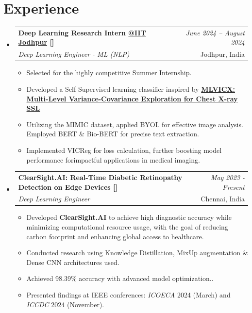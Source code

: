\documentclass[a4paper,11pt]{article}
\makeatletter
\newcommand{\resumeSubheading}[4]{
\vspace{0.5mm}\item
    \begin{tabular*}{0.98\textwidth}[t]{l@{\extracolsep{\fill}}r}
        \textbf{#1} & \textit{\footnotesize{#4}} \\
        \textit{\footnotesize{#3}} &  \footnotesize{#2}\\
    \end{tabular*}
    \vspace{-2.4mm}
}
\newcommand{\resumeSubHeadingListStart}{\begin{itemize}[leftmargin=*,labelsep=1mm]}
\newcommand{\resumeItemListStart}{\begin{itemize}[leftmargin=*,labelsep=1mm,itemsep=0.5mm]}
\newcommand{\resumeSubHeadingListEnd}{\end{itemize}\vspace{2mm}}
\newcommand{\resumeItemListEnd}{\end{itemize}\vspace{-2mm}}
\makeatother
\begin{document}
\section{\textbf{Experience}}
\vspace{-0.4mm}
  \resumeSubHeadingListStart
  \resumeSubheading
      {{Deep Learning Research Intern \href{https://www.iitj.ac.in/}{@IIT Jodhpur}  [\href{https://github.com/FRAGGERR/BYOL-Bio-BERT-ON-MIMIC-Chest-X-ray-Dataset}{\faGithub}}]}{Jodhpur, India}
      {Deep Learning Engineer - ML (NLP)}{June 2024 – August 2024}
      \resumeItemListStart
        \item Selected for the highly competitive Summer Internship.
        \item Developed a Self-Supervised learning classifier inspired by \newline 
        \textbf{\href{https://arxiv.org/abs/2403.11504}{MLVICX: Multi-Level Variance-Covariance Exploration for Chest X-ray SSL}}
        \item Utilizing the MIMIC dataset, applied BYOL for effective image analysis. Employed \newline  BERT \& Bio-BERT for precise text extraction.
        \item Implemented VICReg for loss calculation, further boosting model performance for\newline impactful
applications in medical imaging. 
      \resumeItemListEnd 
  \resumeSubheading
    {\textbf{ClearSight.AI}: Real-Time Diabetic Retinopathy Detection on Edge Devices [\href{https://github.com/FRAGGERR/Diabetic-Retinopathy}{\faGithub}]}{Chennai, India}
    {Deep Learning Engineer}{May 2023 - Present}
    \resumeItemListStart
      \item Developed \textbf{ClearSight.AI} to achieve high diagnostic accuracy while minimizing computational \newline resource usage, with the goal of reducing carbon footprint and enhancing global access to healthcare.
      \item Conducted research using Knowledge Distillation, MixUp augmentation \& Dense CNN architectures used.
      \item Achieved 98.39\% accuracy with advanced model optimization..
      \item Presented findings at IEEE conferences:\textit{ ICOECA} 2024 (March) and \textit{ICCDC} 2024 (November).
    \resumeItemListEnd
  \resumeSubHeadingListEnd
\vspace{-6mm}
\end{document}
